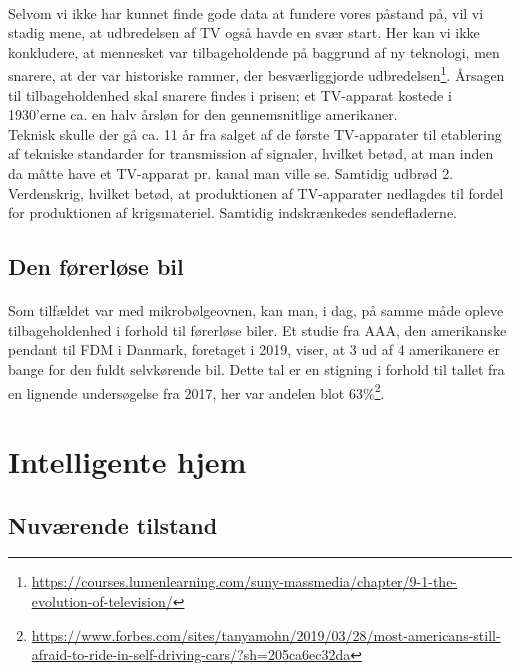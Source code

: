 \documentclass{article}
\begin{document}
\paragraph{}
Selvom vi ikke har kunnet finde gode data at fundere vores påstand på, vil vi stadig mene, at udbredelsen af TV også havde en svær start. Her kan vi ikke konkludere, at mennesket var tilbageholdende på baggrund af ny teknologi, men snarere, at der var historiske rammer, der besværliggjorde udbredelsen\footnote{\url{https://courses.lumenlearning.com/suny-massmedia/chapter/9-1-the-evolution-of-television/}}. 
Årsagen til tilbageholdenhed skal snarere findes i prisen; et TV-apparat kostede i 1930'erne ca. en halv årsløn for den gennemsnitlige amerikaner. \\
Teknisk skulle der gå ca. 11 år fra salget af de første TV-apparater til etablering af tekniske standarder for transmission af signaler, hvilket betød, at man inden da måtte have et TV-apparat pr. kanal man ville se.
Samtidig udbrød 2. Verdenskrig, hvilket betød, at produktionen af TV-apparater nedlagdes til fordel for produktionen af krigsmateriel. Samtidig indskrænkedes sendefladerne. 
\subsection{Den førerløse bil}
\paragraph{}
Som tilfældet var med mikrobølgeovnen, kan man, i dag, på samme måde opleve tilbageholdenhed i forhold til førerløse biler. Et studie fra AAA, den amerikanske pendant
til FDM i Danmark, foretaget i 2019, viser, at 3 ud af 4 amerikanere er bange for den fuldt selvkørende bil.
Dette tal er en stigning i forhold til tallet fra en lignende undersøgelse fra 2017, her var andelen blot 63\%\footnote{\url{https://www.forbes.com/sites/tanyamohn/2019/03/28/most-americans-still-afraid-to-ride-in-self-driving-cars/?sh=205ca6ec32da}}.
\section{Intelligente hjem}
\subsection{Nuværende tilstand}
\end{document}
